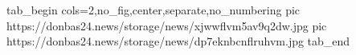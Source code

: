  
 
 
 
 

\ifcmt
  tab_begin cols=2,no_fig,center,separate,no_numbering
     pic https://donbas24.news/storage/news/xjwwflvm5av9q2dw.jpg
		 pic https://donbas24.news/storage/news/dp7eknbcnflruhvm.jpg
  tab_end
\fi
